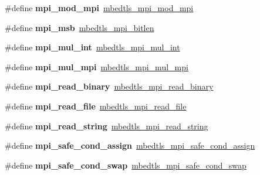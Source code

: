 \begin{DoxyCompactItemize}
\#define {\bfseries mpi\+\_\+mod\+\_\+mpi}~\mbox{\hyperlink{bignum_8h_a7b9db15054cb320c69dd065d3f17e674}{mbedtls\+\_\+mpi\+\_\+mod\+\_\+mpi}}
\item 
\mbox{\label{compat-1_83_8h_a418e38b8323fbba2031cadaecaaa79b4}} 
\#define {\bfseries mpi\+\_\+msb}~\mbox{\hyperlink{bignum_8h_a681ab2710d044c0cb091b6497c6ed395}{mbedtls\+\_\+mpi\+\_\+bitlen}}
\item 
\mbox{\label{compat-1_83_8h_a5668ef6c168882a9c33a8de7a0821e19}} 
\#define {\bfseries mpi\+\_\+mul\+\_\+int}~\mbox{\hyperlink{bignum_8h_ac4a22cb29f7e19dd4c823d1868f45eab}{mbedtls\+\_\+mpi\+\_\+mul\+\_\+int}}
\item 
\mbox{\label{compat-1_83_8h_acbbd38c3d0b2bd75eb7916089433912a}} 
\#define {\bfseries mpi\+\_\+mul\+\_\+mpi}~\mbox{\hyperlink{bignum_8h_aa9065cae8e3a287095b4043317f6b706}{mbedtls\+\_\+mpi\+\_\+mul\+\_\+mpi}}
\item 
\mbox{\label{compat-1_83_8h_aa1d0b9dbe5d1fda001c09d0063f5e6fb}} 
\#define {\bfseries mpi\+\_\+read\+\_\+binary}~\mbox{\hyperlink{bignum_8h_a68f62c99e53eb034daea486e5d5d83ca}{mbedtls\+\_\+mpi\+\_\+read\+\_\+binary}}
\item 
\mbox{\label{compat-1_83_8h_a3da188fc572d38f2c55cb892d9096271}} 
\#define {\bfseries mpi\+\_\+read\+\_\+file}~\mbox{\hyperlink{bignum_8h_acb4d0ed28a946cfa83219ae8709941d4}{mbedtls\+\_\+mpi\+\_\+read\+\_\+file}}
\item 
\mbox{\label{compat-1_83_8h_a7c882f8b2248ec86376c7b65ca01e29d}} 
\#define {\bfseries mpi\+\_\+read\+\_\+string}~\mbox{\hyperlink{bignum_8h_a15efd3f2f86700b69f6c18d34ac05758}{mbedtls\+\_\+mpi\+\_\+read\+\_\+string}}
\item 
\mbox{\label{compat-1_83_8h_a43ad3d7fc639983c1122a72ee937d2a8}} 
\#define {\bfseries mpi\+\_\+safe\+\_\+cond\+\_\+assign}~\mbox{\hyperlink{bignum_8h_a623c565706f22d8fbcc665ba49a51c7c}{mbedtls\+\_\+mpi\+\_\+safe\+\_\+cond\+\_\+assign}}
\item 
\mbox{\label{compat-1_83_8h_a793a130ac27da6da278915a2aa3c8490}} 
\#define {\bfseries mpi\+\_\+safe\+\_\+cond\+\_\+swap}~\mbox{\hyperlink{bignum_8h_a956c54f87d26ceb6da98043805e67684}{mbedtls\+\_\+mpi\+\_\+safe\+\_\+cond\+\_\+swap}}

\end{DoxyCompactItemize}
